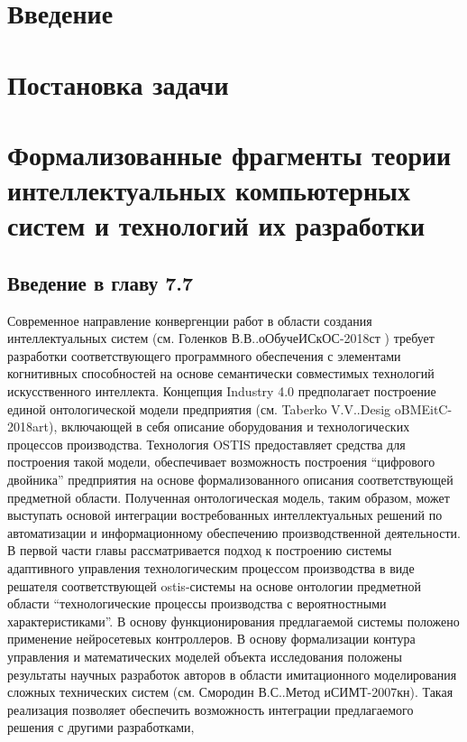 \section*{Введение}


\newpage
\section{Постановка задачи}


\newpage
\section{Формализованные фрагменты теории интеллектуальных компьютерных систем и технологий их разработки}
\begin{small}
\section*{Введение в главу 7.7}
Современное направление конвергенции работ в области создания интеллектуальных систем (см. Голенков
В.В..оОбучеИСкОС-2018ст ) требует разработки соответствующего программного обеспечения с элементами
когнитивных способностей на основе семантически совместимых технологий искусственного интеллекта. Концепция Industry 4.0 предполагает построение единой онтологической модели предприятия (см. Taberko V.V..Desig
oBMEitC-2018art), включающей в себя описание оборудования и технологических процессов производства. Технология OSTIS предоставляет средства для построения такой модели, обеспечивает возможность построения
“цифрового двойника” предприятия на основе формализованного описания соответствующей предметной области. Полученная онтологическая модель, таким образом, может выступать основой интеграции востребованных
интеллектуальных решений по автоматизации и информационному обеспечению производственной деятельности.
В первой части главы рассматривается подход к построению системы адаптивного управления технологическим
процессом производства в виде решателя соответствующей ostis-системы на основе онтологии предметной области “технологические процессы производства с вероятностными характеристиками”. В основу функционирования
предлагаемой системы положено применение нейросетевых контроллеров. В основу формализации контура управления и математических моделей объекта исследования положены результаты научных разработок авторов в
области имитационного моделирования сложных технических систем (см. Смородин В.С..Метод иСИМТ-2007кн).
Такая реализация позволяет обеспечить возможность интеграции предлагаемого решения с другими разработками,

\end{small}
